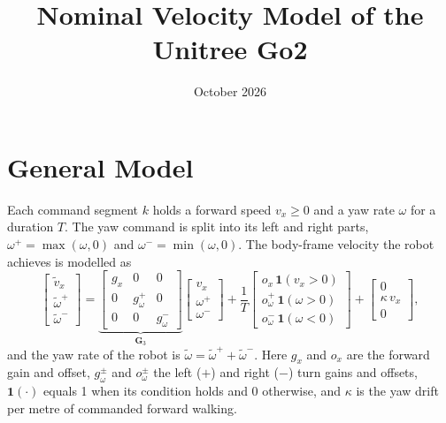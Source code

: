 \documentclass[11pt]{article}
\title{Nominal Velocity Model of the Unitree Go2}
\date{October 2026}
\begin{document}
\maketitle

\section{General Model}
Each command segment $k$ holds a forward speed $v_x \ge 0$ and a yaw rate $\omega$ for a duration $T$.
The yaw command is split into its left and right parts, $\omega^{+} = \max(\omega, 0)$ and $\omega^{-} = \min(\omega, 0)$.
The body-frame velocity the robot achieves is modelled as
\begin{equation}
  \begin{bmatrix} \tilde v_x \\ \tilde\omega^{+} \\ \tilde\omega^{-} \end{bmatrix}
  =
  \underbrace{\begin{bmatrix} g_x & 0 & 0 \\ 0 & g_\omega^{+} & 0 \\ 0 & 0 & g_\omega^{-} \end{bmatrix}}_{\mathbf{G}_3}
  \begin{bmatrix} v_x \\ \omega^{+} \\ \omega^{-} \end{bmatrix}
  + \frac{1}{T}
  \begin{bmatrix} o_x\,\mathbf{1}(v_x>0) \\ o_\omega^{+}\,\mathbf{1}(\omega>0) \\ o_\omega^{-}\,\mathbf{1}(\omega<0) \end{bmatrix}
  +
  \begin{bmatrix} 0 \\ \kappa\, v_x \\ 0 \end{bmatrix},
  \label{eq:general}
\end{equation}
and the yaw rate of the robot is $\tilde\omega = \tilde\omega^{+} + \tilde\omega^{-}$.
Here $g_x$ and $o_x$ are the forward gain and offset, $g_\omega^{\pm}$ and $o_\omega^{\pm}$ the left ($+$) and right ($-$) turn gains and offsets, $\mathbf{1}(\cdot)$ equals 1 when its condition holds and 0 otherwise, and $\kappa$ is the yaw drift per metre of commanded forward walking.
\end{document}
